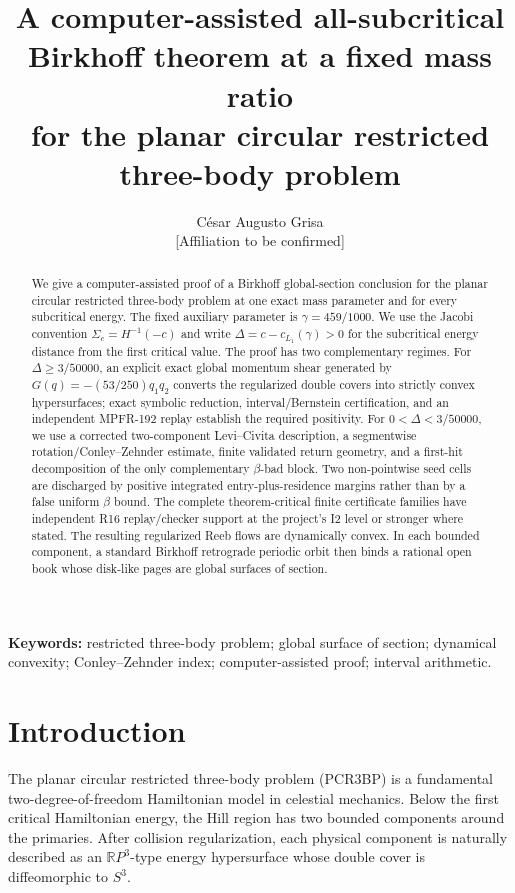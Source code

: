 \documentclass[11pt]{article}
\title{A computer-assisted all-subcritical Birkhoff theorem at a fixed mass ratio\\for the planar circular restricted three-body problem}
\author{C\'esar Augusto Grisa\\\small [Affiliation to be confirmed]}
\date{}
\newcommand{\RP}{\mathbb{R}P}
\begin{document}
\maketitle

\begin{abstract}
We give a computer-assisted proof of a Birkhoff global-section conclusion for the planar circular restricted three-body problem at one exact mass parameter and for every subcritical energy. The fixed auxiliary parameter is $\gamma=459/1000$. We use the Jacobi convention $\Sigma_c=H^{-1}(-c)$ and write $\Delta=c-c_{L_1}(\gamma)>0$ for the subcritical energy distance from the first critical value. The proof has two complementary regimes. For $\Delta\ge 3/50000$, an explicit exact global momentum shear generated by $G(q)=-(53/250)q_1q_2$ converts the regularized double covers into strictly convex hypersurfaces; exact symbolic reduction, interval/Bernstein certification, and an independent MPFR-192 replay establish the required positivity. For $0<\Delta<3/50000$, we use a corrected two-component Levi--Civita description, a segmentwise rotation/Conley--Zehnder estimate, finite validated return geometry, and a first-hit decomposition of the only complementary $\beta$-bad block. Two non-pointwise seed cells are discharged by positive integrated entry-plus-residence margins rather than by a false uniform $\beta$ bound. The complete theorem-critical finite certificate families have independent R16 replay/checker support at the project's I2 level or stronger where stated. The resulting regularized Reeb flows are dynamically convex. In each bounded component, a standard Birkhoff retrograde periodic orbit then binds a rational open book whose disk-like pages are global surfaces of section.
\end{abstract}

\noindent\textbf{Keywords:} restricted three-body problem; global surface of section; dynamical convexity; Conley--Zehnder index; computer-assisted proof; interval arithmetic.

\section{Introduction}
The planar circular restricted three-body problem (PCR3BP) is a fundamental two-degree-of-freedom Hamiltonian model in celestial mechanics. Below the first critical Hamiltonian energy, the Hill region has two bounded components around the primaries. After collision regularization, each physical component is naturally described as an $\RP^3$-type energy hypersurface whose double cover is diffeomorphic to $S^3$.
\end{document}
